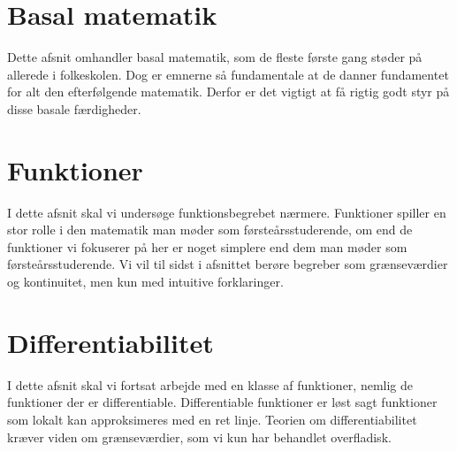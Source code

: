 \chapter{Basal matematik}
Dette afsnit omhandler basal matematik, som de fleste første gang støder på allerede i folkeskolen. Dog er emnerne så fundamentale at de danner fundamentet for alt den efterfølgende matematik. Derfor er det vigtigt at få rigtig godt styr på disse basale færdigheder.


















\chapter{Funktioner}
I dette afsnit skal vi undersøge funktionsbegrebet nærmere. Funktioner spiller en stor rolle i den matematik man møder som førsteårsstuderende, om end de funktioner vi fokuserer på her er noget simplere end dem man møder som førsteårsstuderende. Vi vil til sidst i afsnittet berøre begreber som grænseværdier og kontinuitet, men kun med intuitive forklaringer. 


















\chapter{Differentiabilitet}
I dette afsnit skal vi fortsat arbejde med en klasse af funktioner, nemlig de funktioner der er differentiable. Differentiable funktioner er løst sagt funktioner som lokalt kan approksimeres med en ret linje. Teorien om differentiabilitet kræver viden om grænseværdier, som vi kun har behandlet overfladisk.



